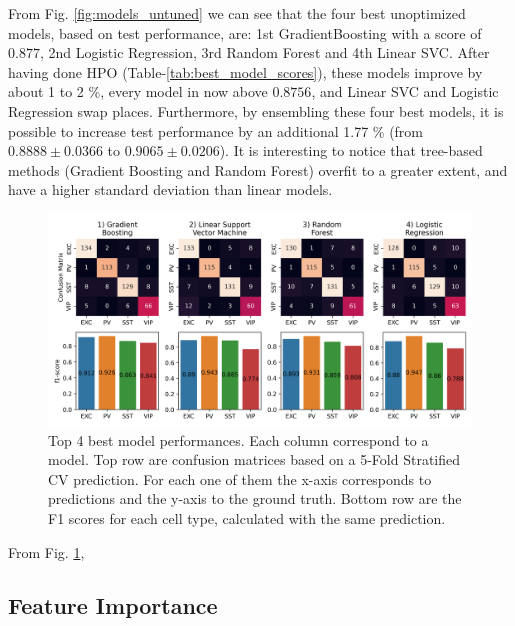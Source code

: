 \documentclass{IEEEtran}
\begin{document}
From Fig. \ref{fig:models_untuned} we can see that the four best unoptimized models, based on test performance, are: 1st GradientBoosting with a score of $0.877$, 2nd Logistic Regression, 3rd Random Forest and 4th Linear SVC. After having done HPO (Table-\ref{tab:best_model_scores}), these models improve by about 1 to 2 \%, every model in now above $0.8756$, and Linear SVC and Logistic Regression swap places. Furthermore, by ensembling these four best models, it is possible to increase test performance by an additional  1.77 \% (from $0.8888 \pm 0.0366$ to $0.9065 \pm 0.0206$).
It is interesting to notice that tree-based methods (Gradient Boosting and Random Forest) overfit to a greater extent, and have a higher standard deviation than linear models.

\begin{figure}[h!]
  \centering
  \includegraphics[width=\columnwidth]{figures/confusion_matrices_of_classifiers.png}
  \caption{Top 4 best model performances. Each column correspond to a model. Top row are confusion matrices based on a 5-Fold Stratified CV prediction. For each one of them the x-axis corresponds to predictions and the y-axis to the ground truth. Bottom row are the F1 scores for each cell type, calculated with the same prediction.}
  \label{fig:supervised_confusion_matrices}
\end{figure}

From Fig. \ref{fig:supervised_confusion_matrices}, 


\subsection{Feature Importance}
\end{document}
